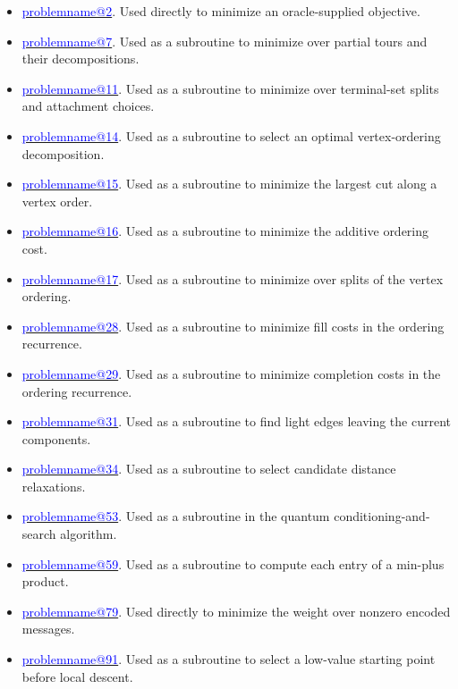 \documentclass[11pt,a4paper]{article}
\makeatletter
\theoremstyle{problemstyle}
\newcommand{\problemref}[1]{\hyperref[entry:#1]{\textcolor{blue}{\csname problemname@#1\endcsname}}}
\makeatother
\begin{document}
\begin{itemize}[label=\textbullet,leftmargin=1.3em,itemsep=2pt,topsep=3pt,parsep=0pt]\small

\item \problemref{2}. Used directly to minimize an oracle-supplied objective.

\item \problemref{7}. Used as a subroutine to minimize over partial tours and their decompositions.

\item \problemref{11}. Used as a subroutine to minimize over terminal-set splits and attachment choices.

\item \problemref{14}. Used as a subroutine to select an optimal vertex-ordering decomposition.

\item \problemref{15}. Used as a subroutine to minimize the largest cut along a vertex order.

\item \problemref{16}. Used as a subroutine to minimize the additive ordering cost.

\item \problemref{17}. Used as a subroutine to minimize over splits of the vertex ordering.

\item \problemref{28}. Used as a subroutine to minimize fill costs in the ordering recurrence.

\item \problemref{29}. Used as a subroutine to minimize completion costs in the ordering recurrence.

\item \problemref{31}. Used as a subroutine to find light edges leaving the current components.

\item \problemref{34}. Used as a subroutine to select candidate distance relaxations.

\item \problemref{53}. Used as a subroutine in the quantum conditioning-and-search algorithm.

\item \problemref{59}. Used as a subroutine to compute each entry of a min-plus product.

\item \problemref{79}. Used directly to minimize the weight over nonzero encoded messages.

\item \problemref{91}. Used as a subroutine to select a low-value starting point before local descent.

\end{itemize}
\end{document}
